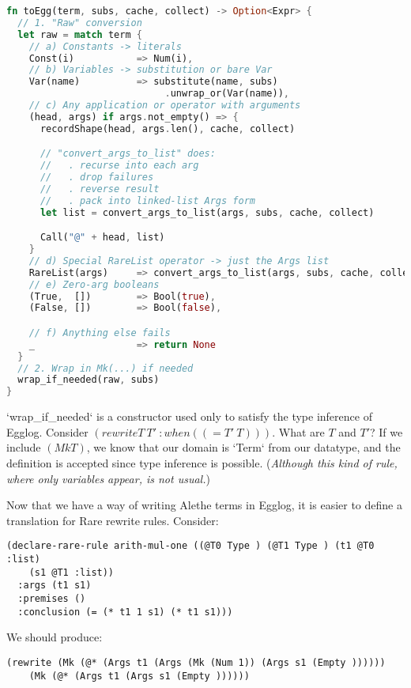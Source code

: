 \documentclass{article}
\begin{document}
\begin{lstlisting}[language=Rust]
fn toEgg(term, subs, cache, collect) -> Option<Expr> {
  // 1. "Raw" conversion
  let raw = match term {
    // a) Constants -> literals
    Const(i)           => Num(i),
    // b) Variables -> substitution or bare Var
    Var(name)          => substitute(name, subs)
                            .unwrap_or(Var(name)),
    // c) Any application or operator with arguments
    (head, args) if args.not_empty() => {
      recordShape(head, args.len(), cache, collect)

      // "convert_args_to_list" does:
      //   . recurse into each arg
      //   . drop failures
      //   . reverse result
      //   . pack into linked-list Args form
      let list = convert_args_to_list(args, subs, cache, collect)

      Call("@" + head, list)
    }
    // d) Special RareList operator -> just the Args list
    RareList(args)     => convert_args_to_list(args, subs, cache, collect),
    // e) Zero-arg booleans
    (True,  [])        => Bool(true),
    (False, [])        => Bool(false),

    // f) Anything else fails
    _                  => return None
  }
  // 2. Wrap in Mk(...) if needed
  wrap_if_needed(raw, subs)
}
\end{lstlisting}

`wrap\_if\_needed` is a constructor used only to satisfy the type inference of Egglog. Consider $(rewrite T\:T'\::when ((= T'\:T)))$. What are $T$ and $T'$? If we include $(Mk T)$, we know that our domain is `Term` from our datatype, and the definition is accepted since type inference is possible. (\emph{Although this kind of rule, where only variables appear, is not usual.})

Now that we have a way of writing Alethe terms in Egglog, it is easier to define a translation for Rare rewrite rules. Consider:

\begin{lstlisting}
(declare-rare-rule arith-mul-one ((@T0 Type ) (@T1 Type ) (t1 @T0 :list) 
    (s1 @T1 :list))
  :args (t1 s1)
  :premises ()
  :conclusion (= (* t1 1 s1) (* t1 s1)))
\end{lstlisting}

We should produce:
\begin{lstlisting}
(rewrite (Mk (@* (Args t1 (Args (Mk (Num 1)) (Args s1 (Empty ))))))
    (Mk (@* (Args t1 (Args s1 (Empty ))))))
\end{lstlisting}
\end{document}
